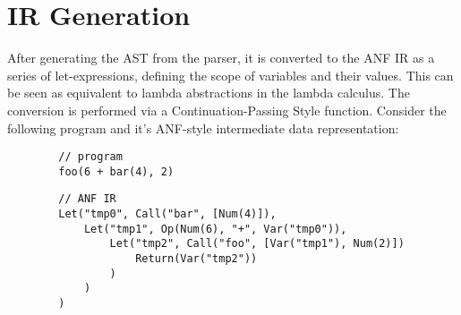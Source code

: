 \section{IR Generation}

After generating the AST from the parser, it is converted to the ANF IR as a series of
let-expressions, defining the scope of variables and their values. This can be seen as equivalent to
lambda abstractions in the lambda calculus. The conversion is performed via a Continuation-Passing
Style function. Consider the following program and it's ANF-style intermediate data representation:

\begin{tcolorbox}
    \begin{verbatim}
        // program
        foo(6 + bar(4), 2)
    \end{verbatim}
    \tcblower
    \begin{verbatim}
        // ANF IR
        Let("tmp0", Call("bar", [Num(4)]),
            Let("tmp1", Op(Num(6), "+", Var("tmp0")),
                Let("tmp2", Call("foo", [Var("tmp1"), Num(2)])
                    Return(Var("tmp2"))
                )
            )
        )
    \end{verbatim}
\end{tcolorbox}



